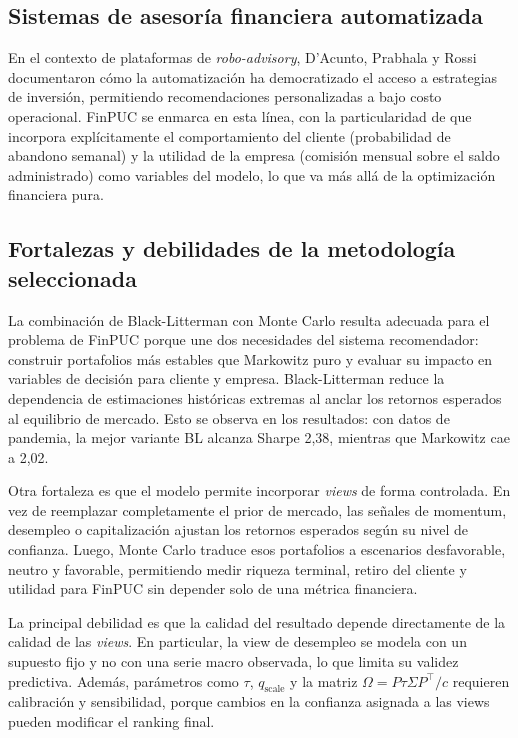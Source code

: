 \subsection{Sistemas de asesor\'ia financiera automatizada}

En el contexto de plataformas de \textit{robo-advisory}, D'Acunto, Prabhala y
Rossi \cite{dacunto2019} documentaron c\'omo la automatizaci\'on ha
democratizado el acceso a estrategias de inversi\'on, permitiendo
recomendaciones personalizadas a bajo costo operacional. FinPUC se enmarca en
esta l\'inea, con la particularidad de que incorpora expl\'icitamente el
comportamiento del cliente (probabilidad de abandono semanal) y la utilidad de la
empresa (comisi\'on mensual sobre el saldo administrado) como variables del
modelo, lo que va m\'as all\'a de la optimizaci\'on financiera pura.

\subsection{Fortalezas y debilidades de la metodolog\'ia seleccionada}

La combinaci\'on de Black-Litterman con Monte Carlo resulta adecuada para el problema de FinPUC porque une dos necesidades del sistema recomendador: construir portafolios m\'as estables que Markowitz puro y evaluar su impacto en variables de decisi\'on para cliente y empresa. Black-Litterman reduce la dependencia de estimaciones hist\'oricas extremas al anclar los retornos esperados al equilibrio de mercado. Esto se observa en los resultados: con datos de pandemia, la mejor variante BL alcanza Sharpe 2,38, mientras que Markowitz cae a 2,02.

Otra fortaleza es que el modelo permite incorporar \textit{views} de forma controlada. En vez de reemplazar completamente el prior de mercado, las se\~nales de momentum, desempleo o capitalizaci\'on ajustan los retornos esperados seg\'un su nivel de confianza. Luego, Monte Carlo traduce esos portafolios a escenarios desfavorable, neutro y favorable, permitiendo medir riqueza terminal, retiro del cliente y utilidad para FinPUC sin depender solo de una m\'etrica financiera.

La principal debilidad es que la calidad del resultado depende directamente de la calidad de las \textit{views}. En particular, la view de desempleo se modela con un supuesto fijo y no con una serie macro observada, lo que limita su validez predictiva. Adem\'as, par\'ametros como $\tau$, $q_{\text{scale}}$ y la matriz $\Omega = P\tau\Sigma P^\top / c$ requieren calibraci\'on y sensibilidad, porque cambios en la confianza asignada a las views pueden modificar el ranking final.

